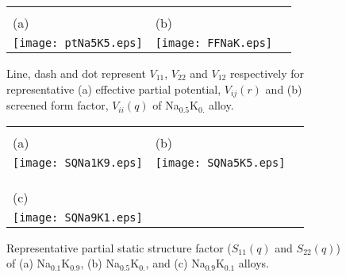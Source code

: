 \documentclass[final12pt]{elsarticle}
\begin{document}
\begin{figure}[htp]
\begin{center}
\begin{tabular}{lll}
\vspace{-2.7cm}
 \\(a)& (b) \\
\texttt{[image: ptNa5K5.eps]}&
\texttt{[image: FFNaK.eps]}
\end{tabular}
\caption{Line, dash and dot represent $V_{11}$, $V_{22}$ and $V_{12}$ respectively for representative (a) effective partial potential, $V_{ij}(r)$ and (b) screened form factor, $V_{ii}(q)$ of Na$_{0.5}$K$_{0.}$ alloy.}
\label{pfig2}
\end{center}
\end{figure}

\begin{figure}[htp]
\begin{center}
\begin{tabular}{lll}
\vspace{-2.7cm}
 \\(a)& (b) \\
\texttt{[image: SQNa1K9.eps]}&
\texttt{[image: SQNa5K5.eps]}\\&\\&\\
\vspace{-3.0cm}
\\(c)\\
\texttt{[image: SQNa9K1.eps]}

\end{tabular}
\caption{Representative partial static structure factor ($S_{11}(q)$ and $S_{22}(q)$) of (a) Na$_{0.1}$K$_{0.9}$, (b) Na$_{0.5}$K$_{0.}$, and (c) Na$_{0.9}$K$_{0.1}$ alloys.}
\label{pfig3}
\end{center}
\end{figure}
\end{document}
